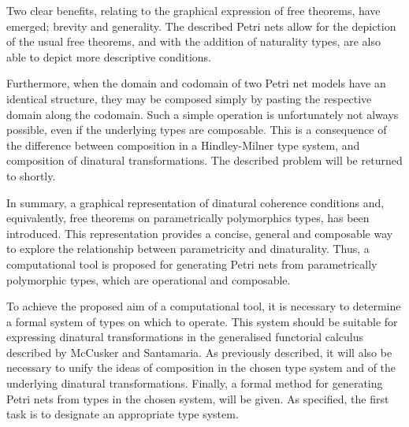 \documentclass[../../Reflection.tex]{subfiles}
\begin{document}
Two clear benefits, relating to the graphical expression of free theorems, have emerged; brevity and generality. The described Petri nets allow for the depiction of the usual free theorems, and with the addition of naturality types, are also able to depict more descriptive conditions. 
\par
Furthermore, when the domain and codomain of two Petri net models have an identical structure, they may be composed simply by pasting the respective domain along the codomain. Such a simple operation is unfortunately not always possible, even if the underlying types are composable. This is a consequence of the difference between composition in a Hindley-Milner type system, and composition of dinatural transformations. The described problem will be returned to shortly.
\par
In summary, a graphical representation of dinatural coherence conditions and, equivalently, free theorems on parametrically polymorphics types, has been introduced. This representation provides  a concise, general and composable way to explore the relationship between parametricity and dinaturality. Thus, a computational tool is proposed for generating Petri nets from parametrically polymorphic types, which are operational and composable. 
\par
To achieve the proposed aim of a computational tool, it is necessary to determine a formal system of types on which to operate. This system should be suitable for expressing dinatural transformations in the generalised functorial calculus described by McCusker and Santamaria. As previously described, it will also be necessary to unify the ideas of composition in the chosen type system and of the underlying dinatural transformations. Finally, a formal method for generating Petri nets from types in the chosen system, will be given. As specified, the first task is to designate an appropriate type system.
\end{document}
